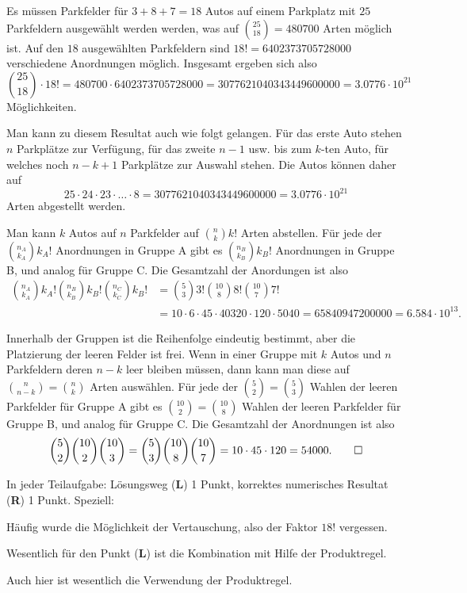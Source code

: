 \begin{loesung}
\begin{teilaufgaben}
\item Es müssen Parkfelder für $3 + 8 + 7 = 18$ Autos auf einem
Parkplatz mit $25$ Parkfeldern ausgewählt werden
werden, was auf $\binom{25}{18}=480700$ Arten möglich ist.
Auf den $18$ ausgewählten Parkfeldern sind $18!=6402373705728000$
verschiedene Anordnungen möglich.
Insgesamt ergeben sich also
\[
\binom{25}{18}\cdot 18!=480700 \cdot 6402373705728000=3077621040343449600000
=3.0776\cdot10^{21}
\]
Möglichkeiten.

Man kann zu diesem Resultat auch wie folgt gelangen.
Für das erste Auto stehen $n$ Parkplätze zur Verfügung, für das zweite
$n-1$ usw. bis zum $k$-ten Auto, für welches noch $n-k+1$ Parkplätze
zur Auswahl stehen. Die Autos können daher auf
\[
25\cdot
24\cdot
23\cdot
\dots
\cdot
8
=
3077621040343449600000
=3.0776\cdot10^{21}
\]
Arten abgestellt werden.
\item Man kann $k$ Autos auf $n$ Parkfelder auf $\binom{n}{k}k!$ Arten
abstellen. Für jede der $\binom{n_A}{k_A}k_A!$ Anordnungen in Gruppe A gibt es 
$\binom{n_B}{k_B}k_B!$ Anordnungen in Gruppe B, und analog für Gruppe C.
Die Gesamtzahl der Anordungen ist also
\begin{align*}
\binom{n_A}{k_A}k_A!
\binom{n_B}{k_B}k_B!
\binom{n_C}{k_C}k_B!
&=
\binom{5}{3}3!
\binom{10}{8}8!
\binom{10}{7}7!
\\
&=10\cdot 6\cdot 45\cdot 40320\cdot 120\cdot 5040=65840947200000=6.584\cdot10^{13}.
\end{align*}
\item Innerhalb der Gruppen ist die Reihenfolge eindeutig bestimmt, aber
die Platzierung der leeren Felder ist frei.
Wenn in einer Gruppe mit $k$ Autos und $n$ Parkfeldern deren $n-k$
leer bleiben müssen,
dann kann man diese auf $\binom{n}{n-k}=\binom{n}{k}$ Arten auswählen.
Für jede der $\binom{5}{2}=\binom{5}{3}$ Wahlen der leeren Parkfelder
für Gruppe A gibt es $\binom{10}{2}=\binom{10}{8}$ Wahlen der
leeren Parkfelder für Gruppe B, und analog für Gruppe C.
Die Gesamtzahl der Anordnungen ist also
\[
\binom{5}{2}
\binom{10}{2}
\binom{10}{3}
=
\binom{5}{3}
\binom{10}{8}
\binom{10}{7}
=10\cdot 45\cdot 120=54000.
\qedhere
\]
\end{teilaufgaben}
\end{loesung}

\begin{bewertung}
In jeder Teilaufgabe: Lösungsweg ({\bf L}) 1 Punkt, korrektes numerisches
Resultat ({\bf R}) 1 Punkt. Speziell:
\begin{teilaufgaben}
\item Häufig wurde die Möglichkeit der Vertauschung, also der Faktor
$18!$ vergessen.
\item Wesentlich für den Punkt ({\bf L}) ist die Kombination mit Hilfe
der Produktregel.
\item Auch hier ist wesentlich die Verwendung der Produktregel.
\end{teilaufgaben}
\end{bewertung}

